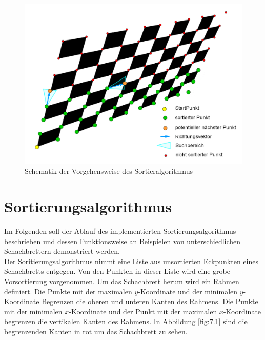 

\begin{figure}[!htb]
	\centering
	\includegraphics[width=0.8\linewidth]{images/VerzeichnetesSchachbretFunktion.png}
	\caption[Funktionsübersicht des Sorieralgorithmus]{Schematik der Vorgehensweise des Sortieralgorithmus}
	\label{fig:UebersichtSortierungsAlg}
\end{figure}




\section{Sortierungsalgorithmus}

Im Folgenden soll der Ablauf des implementierten Sortierungsalgorithmus beschrieben und dessen Funktionsweise an Beispielen von unterschiedlichen Schachbrettern demonstriert werden.\\

Der Soritierungsalgorithmus nimmt eine Liste aus unsortierten Eckpunkten eines Schachbretts entgegen. Von den Punkten in dieser Liste wird eine grobe Vorsortierung vorgenommen. Um das Schachbrett herum wird ein Rahmen definiert. Die Punkte mit der maximalen $y$-Koordinate und der minimalen $y$-Koordinate Begrenzen die oberen und unteren Kanten des Rahmens. Die Punkte mit der minimalen $x$-Koordinate und der Punkt mit der maximalen $x$-Koordinate begrenzen die vertikalen Kanten des Rahmens. In Abbildung \ref{fig:7.1} sind die begrenzenden Kanten in rot um das Schachbrett zu sehen.\\

